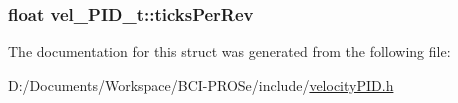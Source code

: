 \subsubsection[{\texorpdfstring{ticks\+Per\+Rev}{ticksPerRev}}]{\setlength{\rightskip}{0pt plus 5cm}float vel\+\_\+\+P\+I\+D\+\_\+t\+::ticks\+Per\+Rev}\hypertarget{structvel___p_i_d__t_ad8f6158e9b8be0168e25e27577f6f9e1}{}\label{structvel___p_i_d__t_ad8f6158e9b8be0168e25e27577f6f9e1}


The documentation for this struct was generated from the following file\+:\begin{DoxyCompactItemize}
\item 
D\+:/\+Documents/\+Workspace/\+B\+C\+I-\/\+P\+R\+O\+Se/include/\hyperlink{velocity_p_i_d_8h}{velocity\+P\+I\+D.\+h}\end{DoxyCompactItemize}
